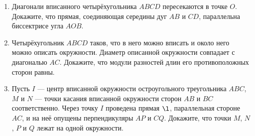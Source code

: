 \documentclass{article}
\begin{document}
\begin{enumerate}[label*=\protect\fbox{\arabic{enumi}}]
\item Диагонали вписанного четырёхугольника $ABCD$ пересекаются в точке $O$. Докажите, что прямая, соединяющая середины дуг $AB$ и $CD$, параллельна биссектрисе угла $AOB$.

\item Четырёхугольник $ABCD$ таков, что в него можно вписать и около него можно описать окружности. Диаметр описанной окружности совпадает с диагональю $AC$. Докажите, что модули разностей длин его противоположных сторон равны.

\item Пусть $I$ — центр вписанной окружности остроугольного треугольника $ABC$, $M$ и $N$ — точки касания вписанной окружности сторон $AB$ и $BC$ соответственно. Через точку $I$ проведена прямая $\l$, параллельная стороне $AC$, и на неё  опущены перпендикуляры $AP$ и $CQ$. Докажите, что точки $M$, $N$, $P$ и $Q$ лежат
на одной окружности.

\end{enumerate}
\end{document}
